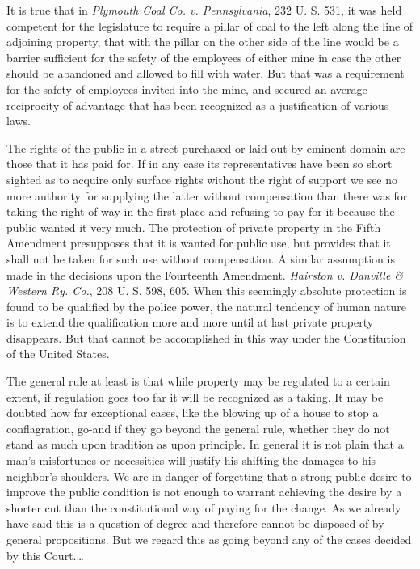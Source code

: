 It is true that in \emph{Plymouth Coal Co. v. Pennsylvania}, 232 U. S. 531, it
was held competent for the legislature to require a pillar of coal to the left
along the line of adjoining property, that with the pillar on the other side of
the line would be a barrier sufficient for the safety of the employees of either
mine in case the other should be abandoned and allowed to fill with water. But
that was a requirement for the safety of employees invited into the mine, and
secured an average reciprocity of advantage that has been recognized as a
justification of various laws.

The rights of the public in a street purchased or laid out by eminent domain are
those that it has paid for. If in any case its representatives have been so
short sighted as to acquire only surface rights without the right of support we
see no more authority for supplying the latter without compensation than there
was for taking the right of way in the first place and refusing to pay for it
because the public wanted it very much. The protection of private property in
the Fifth Amendment presupposes that it is wanted for public use, but provides
that it shall not be taken for such use without compensation. A similar
assumption is made in the decisions upon the Fourteenth Amendment.
\emph{Hairston v. Danville \& Western Ry. Co.}, 208 U. S. 598, 605. When this
seemingly absolute protection is found to be qualified by the police power, the
natural tendency of human nature is to extend the qualification more and more
until at last private property disappears. But that cannot be accomplished in
this way under the Constitution of the United States.

The general rule at least is that while property may be regulated to a certain
extent, if regulation goes too far it will be recognized as a taking. It may be
doubted how far exceptional cases, like the blowing up of a house to stop a
conflagration, go-and if they go beyond the general rule, whether they do not
stand as much upon tradition as upon principle. In general it is not plain that
a man's misfortunes or necessities will justify his shifting the damages to his
neighbor's shoulders. We are in danger of forgetting that a strong public desire
to improve the public condition is not enough to warrant achieving the desire by
a shorter cut than the constitutional way of paying for the change. As we
already have said this is a question of degree-and therefore cannot be disposed
of by general propositions. But we regard this as going beyond any of the cases
decided by this Court.\ldots

